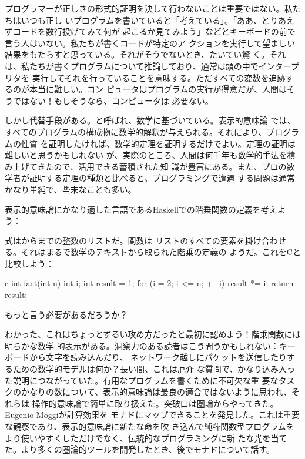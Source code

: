 プログラマーが正しさの形式的証明を決して行わないことは重要ではない。私たちはいつも正し
いプログラムを書いていると「考えている」。「ああ、とりあえずコードを数行投げてみて何が
起こるか見てみよう」などとキーボードの前で言う人はいない。私たちが書くコードが特定のア
クションを実行して望ましい結果をもたらすと思っている。それがそうでないとき、たいてい驚
く。それは、私たちが書くプログラムについて推論しており、通常は頭の中でインタープリタを
実行してそれを行っていることを意味する。ただすべての変数を追跡するのが本当に難しい。コン
ピュータはプログラムの実行が得意だが、人間はそうではない！もしそうなら、コンピュータは
必要ない。

しかし代替手段がある。と呼ばれ、数学に基づいている。表示的意味論
では、すべてのプログラムの構成物に数学的解釈が与えられる。それにより、プログラムの性質
を証明したければ、数学的定理を証明するだけでよい。定理の証明は難しいと思うかもしれない
が、実際のところ、人間は何千年も数学的手法を積み上げてきたので、活用できる蓄積された知
識が豊富にある。また、プロの数学者が証明する定理の種類と比べると、プログラミングで遭遇
する問題は通常かなり単純で、些末なことも多い。

表示的意味論にかなり適した言語であるHaskellでの階乗関数の定義を考えよう：

式\code{{[}1..n{]}}はからまでの整数のリストだ。関数は
リストのすべての要素を掛け合わせる。それはまるで数学のテキストから取られた階乗の定義の
ようだ。これをCと比較しよう：

\begin{snip}{c}
int fact(int n) {
    int i;
    int result = 1;
    for (i = 2; i <= n; ++i)
        result *= i;
    return result;
}
\end{snip}
もっと言う必要があるだろうか？

わかった、これはちょっとずるい攻め方だったと最初に認めよう！階乗関数には明らかな数学
的表示がある。洞察力のある読者はこう問うかもしれない：キーボードから文字を読み込んだり、
ネットワーク越しにパケットを送信したりするための数学的モデルは何か？長い間、これは厄介
な質問で、かなり込み入った説明につながっていた。有用なプログラムを書くために不可欠な重
要なタスクのかなりの数について、表示的意味論は最良の適合ではないように思われ、それらは
操作的意味論で簡単に取り扱えた。突破口は圏論からやってきた。Eugenio Moggiが計算効果を
モナドにマップできることを発見した。これは重要な観察であり、表示的意味論に新たな命を吹
き込んで純粋関数型プログラムをより使いやすくしただけでなく、伝統的なプログラミングに新
たな光を当てた。より多くの圏論的ツールを開発したとき、後でモナドについて話す。

